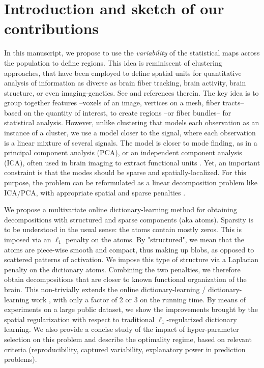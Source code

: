 \section{Introduction and sketch of our contributions}
In this manuscript, we propose to use the \textit{variability} of the statistical
maps across the population to define regions.
%
This idea is reminiscent of
clustering approaches, that have been employed to define spatial units
for quantitative analysis of information as diverse as brain fiber
tracking, brain activity, brain structure, or even imaging-genetics. See   \citep{Varol2014,hibar2013genetic} and references therein.
%
The key idea is to group together features --voxels of an image,
vertices on a mesh, fiber tracts-- based on the quantity of interest, to
create regions --or fiber bundles-- for statistical analysis. However,
unlike clustering that models each observation as an instance of a
cluster, we use a model closer to the signal, where each observation is a
linear mixture of several signals. The model is closer to mode finding,
as in a principal component analysis (PCA), or an independent component
analysis (ICA), often used in brain imaging to extract functional units
  \citep{beckmann2004}. Yet, an important constraint is that the modes
 should be sparse and spatially-localized. For this purpose, the problem can be reformulated as a linear decomposition problem like ICA/PCA, with
 appropriate spatial and sparse penalties   \citep{varoquaux2011,abraham2013}. 

We propose a multivariate online dictionary-learning method for obtaining
decompositions with structured and sparse components (aka atoms).
Sparsity is to be understood in the usual sense: the atoms contain mostly
zeros. This is imposed via an $\ell_1$ penalty on the atoms. 
%
By "structured", we mean that the atoms are piece-wise smooth and
compact, thus making up blobs, as opposed to scattered patterns of
activation. We impose this type of structure via a Laplacian penalty on the
dictionary atoms. Combining the two penalties, we therefore
obtain decompositions that are closer to known functional organization of the brain. This non-trivially extends the online dictionary-learning /
dictionary-learning work   \citep{mairal2010}, with only a factor of 2
or 3 on the running time.
%
By means of experiments on a large public dataset, we show the
improvements brought by the spatial regularization with respect to
traditional $\ell_1$-regularized dictionary learning.
%
We also provide a concise study of the impact of
hyper-parameter selection on this problem and describe the optimality
regime, based on relevant criteria (reproducibility, captured
variability, explanatory power in prediction problems).

